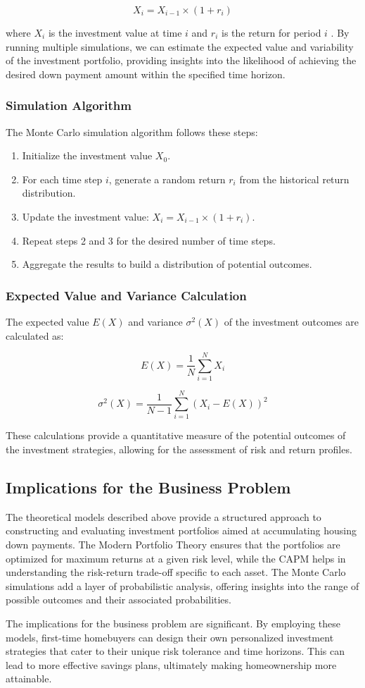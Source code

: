 \[
X_i = X_{i-1} \times (1 + r_i)
\]

where \( X_i \) is the investment value at time \( i \) and \( r_i \) is the return for period \( i \) \citep{boyle1977options}. By running multiple simulations, we can estimate the expected value and variability of the investment portfolio, providing insights into the likelihood of achieving the desired down payment amount within the specified time horizon.

\subsubsection{Simulation Algorithm}
The Monte Carlo simulation algorithm follows these steps:
\begin{enumerate}
    \item Initialize the investment value \( X_0 \).
    \item For each time step \( i \), generate a random return \( r_i \) from the historical return distribution.
    \item Update the investment value: \( X_i = X_{i-1} \times (1 + r_i) \).
    \item Repeat steps 2 and 3 for the desired number of time steps.
    \item Aggregate the results to build a distribution of potential outcomes.
\end{enumerate}

\subsubsection{Expected Value and Variance Calculation}
The expected value \( E(X) \) and variance \( \sigma^2(X) \) of the investment outcomes are calculated as:

\[
E(X) = \frac{1}{N} \sum_{i=1}^{N} X_i
\]

\[
\sigma^2(X) = \frac{1}{N - 1} \sum_{i=1}^{N} (X_i - E(X))^2
\]

These calculations provide a quantitative measure of the potential outcomes of the investment strategies, allowing for the assessment of risk and return profiles.

\subsection{Implications for the Business Problem}
The theoretical models described above provide a structured approach to constructing and evaluating investment portfolios aimed at accumulating housing down payments. The Modern Portfolio Theory ensures that the portfolios are optimized for maximum returns at a given risk level, while the CAPM helps in understanding the risk-return trade-off specific to each asset. The Monte Carlo simulations add a layer of probabilistic analysis, offering insights into the range of possible outcomes and their associated probabilities.

The implications for the business problem are significant. By employing these models, first-time homebuyers can design their own personalized investment strategies that cater to their unique risk tolerance and time horizons. This can lead to more effective savings plans, ultimately making homeownership more attainable.
